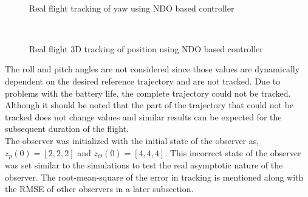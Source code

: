 \documentclass[letterpaper%
, twoside%
, 12pt%
,memoire%
, english%
,creativecommons,hyperref%
]{thETS}
\begin{document}
\begin{figure}[H]
	\centering
	 \\ \parbox{0.75\textwidth}{\caption{Real flight tracking of yaw using NDO based controller\label{Fig:yawtracNDO}}}
\end{figure}
\begin{figure}[H]
	\centering
	 \\ \parbox{0.75\textwidth}{\caption{Real flight 3D tracking of position using NDO based controller\label{Fig:3dNDO}}}
\end{figure}
The roll and pitch angles are not considered since those values are dynamically dependent on the desired reference trajectory and are not tracked. Due to problems with the battery life, the complete trajectory could not be tracked. Although it should be noted that the part of the trajectory that could not be tracked does not change values and similar results can be expected for the subsequent duration of the flight. \\
The observer was initialized with the initial state of the observer as, $z_p(0)=[2,2,2]$ and $z_\Theta(0)=[4,4,4]$. This incorrect state of the observer was set similar to the simulations to test the real asymptotic nature of the observer. The root-mean-square of the error in tracking is mentioned along with the RMSE of other observers in a later subsection.
\FloatBarrier
\end{document}
